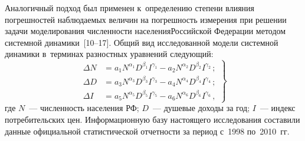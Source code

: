 \begin{multicols}{2}
  Аналогичный подход был применен к~определе\-нию степени влияния
погрешностей наблю\-да\-емых величин на погрешность измерения при решении
задачи моделирования численности населения\linebreak Российской Федерации методом
системной динамики~[10--17]. Общий вид исследованной модели системной
динамики в~терминах разностных уравнений следующий:
  \begin{equation}
  \left.
  \begin{array}{rl}
  \Delta N &= a_1 N^{\alpha_1} D^{\beta_1} I^{\gamma_1} -a_2 N^{\alpha_2}
D^{\beta_2} I^{\gamma_2}\,;\\[6pt]
  \Delta D &= a_3 N^{\alpha_3} D^{\beta_3}I^{\gamma_3} -a_4 N^{\alpha_4}
D^{\beta_4} I^{\gamma_4}\,;\\[6pt]
  \Delta I &= a_5 N^{\alpha_5} D^{\beta_5} I^{\gamma_5} -a_6 N^{\alpha_6}
D^{\beta_6} I^{\gamma_6}\,,
  \end{array}
  \right\}
  \label{e13-spi}
  \end{equation}
где $N$~--- численность населения РФ; $D$~--- душевые доходы за год; $I$~---
индекс потребительских цен. Информационную базу настоящего исследования
составили данные официальной статистической отчетности за период с~1998
по~2010~гг.

  \begin{table*}\small
  \begin{center}
  \vspace*{2ex}


\end{center}
\end{table*}
\end{multicols}
